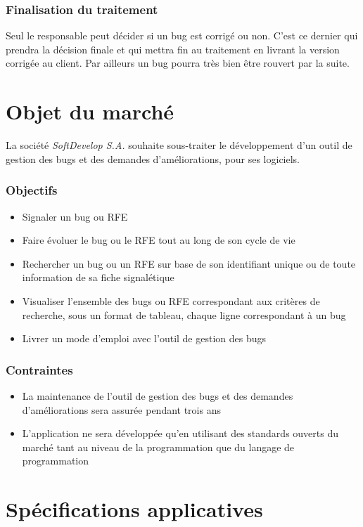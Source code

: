 \documentclass{article}[12pt]
\begin{document}
\subsubsection{Finalisation du traitement}
Seul le responsable peut décider si un bug est corrigé ou non. C'est ce dernier qui prendra la décision finale et qui mettra fin au traitement en livrant la version corrigée au client. Par ailleurs un bug pourra très bien être rouvert par la suite.


\section{Objet du marché}
La société \textit{SoftDevelop S.A.} souhaite sous-traiter le développement d'un outil de gestion des bugs
et des demandes d'améliorations, pour ses logiciels.

\subsubsection{Objectifs}
\begin{itemize}
	\item Signaler un bug ou RFE
	\item Faire évoluer le bug ou le RFE tout au long de son cycle de vie
	\item Rechercher un bug ou un RFE sur base de son identifiant unique ou de toute information de sa fiche signalétique
	\item Visualiser l'ensemble des bugs ou RFE correspondant aux critères de recherche, sous un format de tableau, chaque ligne correspondant à un bug
	\item Livrer un mode d'emploi avec l'outil de gestion des bugs
	
\end{itemize}
\subsubsection{Contraintes}
\begin{itemize}
	\item La maintenance de l'outil de gestion des bugs et des demandes d'améliorations sera assurée pendant trois ans
	\item L'application ne sera développée qu'en utilisant des standards ouverts du marché tant au
	niveau de la programmation que du langage de programmation
\end{itemize}
\newpage
\section{Spécifications applicatives}
\end{document}
